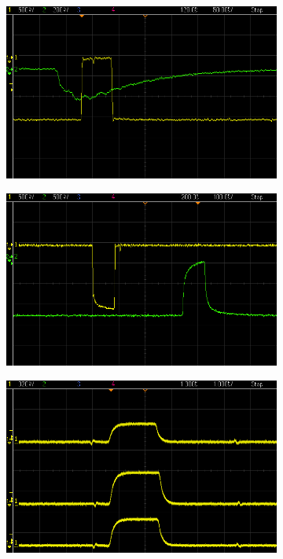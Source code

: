 	\begin{figure}[ht]
		\centering
		\begin{subfigure}{0.32\textwidth}
			\includegraphics[width=\textwidth]{img/Lebensdauer/scope_3.png}
			\subcaption{}		
		\end{subfigure}
		\begin{subfigure}{0.32\textwidth}
			\includegraphics[width=\textwidth]{img/Lebensdauer/scope_4.png}
			\subcaption{}
		\end{subfigure}
		\begin{subfigure}{0.32\textwidth}
			\includegraphics[width=\textwidth]{img/Lebensdauer/scope_5.png}
			\subcaption{}
		\end{subfigure}
		

\end{figure}
